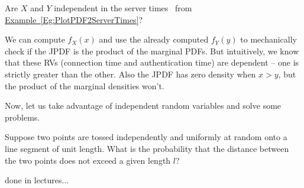 Are $X$ and $Y$ independent in the server times \rv~from \hyperref[Eg:PlotPDF2ServerTimes]{Example~\ref*{Eg:PlotPDF2ServerTimes}}?

We can compute $f_X(x)$ and use the already computed $f_Y(y)$ to mechanically check if the JPDF is the product of the marginal PDFs.  But intuitively, we know that these RVs (connection time and authentication time) are dependent -- one is strictly greater than the other.  
Also the JPDF has zero density when $x>y$, but the product of the marginal densities won't.

Now, let us take advantage of independent random variables and solve some problems.

\begin{example}\label{EgDistBetweenFaultsOnLine}
Suppose two points are tossed independently and uniformly at random onto a line segment of unit length.  
What is the probability that the distance between the two points does not exceed a given length $l$? 

\vspace{5cm}
done in lectures...

\end{example}

